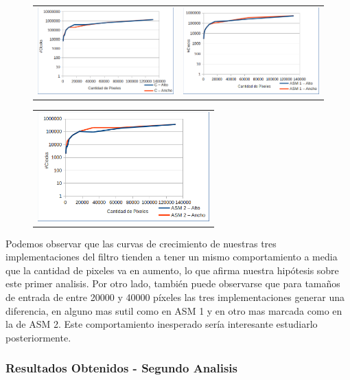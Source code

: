 \begin{figure}[h!]
	\centering
		\begin{tabular}{cc}
		\includegraphics[width=250px]{imgs/sepia-c-analisis1.png} &
		\includegraphics[width=250px]{imgs/sepia-asm1-analisis1.png} \\
		\end{tabular}
		\begin{tabular}{c}
		\includegraphics[width=250px]{imgs/sepia-asm2-analisis1.png} \\
		\end{tabular}
\end{figure}

Podemos observar que las curvas de crecimiento de nuestras tres implementaciones del filtro tienden a tener un mismo comportamiento a media que la cantidad de pixeles va en aumento, lo que afirma nuestra hipótesis sobre este primer analisis. Por otro lado, también puede observarse que para tamaños de entrada de entre 20000 y 40000 píxeles las tres implementaciones generar una diferencia, en alguno mas sutil como en ASM 1 y en otro mas marcada como en la de ASM 2. Este comportamiento inesperado sería interesante estudiarlo posteriormente.

\subsubsection{Resultados Obtenidos - Segundo Analisis}

